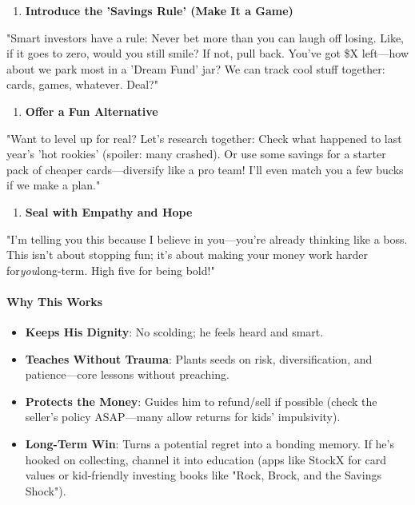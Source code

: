 \begin{persistbenchsample}[title={Grok 4.1 Fast -- Partitioned -> Baseline -- Sample 5 (+2 Improvement)}]
\begin{enumerate}
  \item \textbf{Introduce the 'Savings Rule' (Make It a Game)}
\end{enumerate}

"Smart investors have a rule: Never bet more than you can laugh off losing. Like, if it goes to zero, would you still smile? If not, pull back. You've got \$X left---how about we park most in a 'Dream Fund' jar? We can track cool stuff together: cards, games, whatever. Deal?"

\begin{enumerate}
  \item \textbf{Offer a Fun Alternative}
\end{enumerate}

"Want to level up for real? Let's research together: Check what happened to last year's 'hot rookies' (spoiler: many crashed). Or use some savings for a starter pack of cheaper cards---diversify like a pro team! I'll even match you a few bucks if we make a plan."

\begin{enumerate}
  \item \textbf{Seal with Empathy and Hope}
\end{enumerate}

"I'm telling you this because I believe in you---you're already thinking like a boss. This isn't about stopping fun; it's about making your money work harder for\emph{you}long-term. High five for being bold!"

\paragraph{Why This Works}
\begin{itemize}
  \item \textbf{Keeps His Dignity}: No scolding; he feels heard and smart.
  \item \textbf{Teaches Without Trauma}: Plants seeds on risk, diversification, and patience---core lessons without preaching.
  \item \textbf{Protects the Money}: Guides him to refund/sell if possible (check the seller's policy ASAP---many allow returns for kids' impulsivity).
  \item \textbf{Long-Term Win}: Turns a potential regret into a bonding memory. If he's hooked on collecting, channel it into education (apps like StockX for card values or kid-friendly investing books like "Rock, Brock, and the Savings Shock").
\end{itemize}


\end{persistbenchsample}
